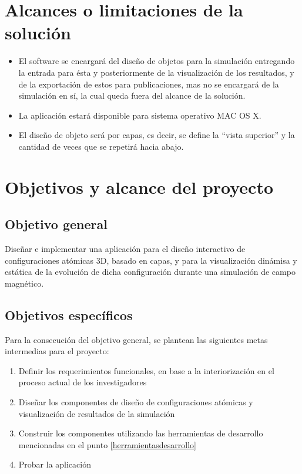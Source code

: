 \section{Alcances o limitaciones de la solución}
\begin{itemize}
	\item El software se encargará del diseño de objetos para la simulación entregando la entrada para ésta y posteriormente de la visualización de los resultados, y de la exportación de estos para publicaciones, mas no se encargará de la simulación en sí, la cual queda fuera del alcance de la solución.
	\item La aplicación estará disponible para sistema operativo MAC OS X.
	\item El diseño de objeto será por capas, es decir, se define la ``vista superior'' y la cantidad de veces que se repetirá hacia abajo.
\end{itemize}

\section{Objetivos y alcance del proyecto}
\label{intro:objetivos}

\subsection{Objetivo general}
Diseñar e implementar una aplicación para el diseño interactivo de configuraciones atómicas 3D, basado en capas, y para la visualización dinámisa y estática de la evolución de dicha configuración durante una simulación de campo magnético.

\subsection{Objetivos espec\'ificos}

Para la consecución del objetivo general, se plantean las siguientes metas intermedias para el proyecto:

\begin{enumerate}
  \item Definir los requerimientos funcionales, en base a la interiorización en el proceso actual de los investigadores
  \item Diseñar los componentes de diseño de configuraciones atómicas y visualización de resultados de la simulación
  \item Construir los componentes utilizando las herramientas de desarrollo mencionadas en el punto \ref{herramientasdesarrollo}
  \item Probar la aplicación
\end{enumerate}


